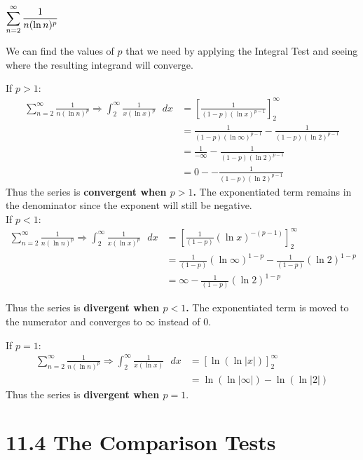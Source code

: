 \documentclass[12pt]{article}
\begin{document}
\begin{solution}
$\mathlarger{\sum_{n=2}^{\infty} \frac{1}{n(\ln n)^p}}$

We can find the values of $p$ that we need by applying the Integral Test and seeing where the resulting integrand will converge.


If $p > 1$:
\begin{align*}
\sum_{n=2}^{\infty} \frac{1}{n(\ln n)^p} \Rightarrow \int^{\infty}_2 \frac{1}{x(\ln x)^{p}} \text{ } dx & = \left[ \frac{1}{(1 - p)(\ln x)^{p -1}} \right]^{\infty}_2 \\
&= \frac{1}{(1 - p)(\ln \infty)^{p - 1}} - \frac{1}{(1 - p)(\ln 2)^{p - 1}} \\
&= \frac{1}{-\infty} - \frac{1}{(1 - p)(\ln 2)^{p - 1}} \\
&= 0 - - \frac{1}{(1 - p)(\ln 2)^{p - 1}} 
\end{align*} Thus the series is \textbf{convergent when $p > 1$.}  The exponentiated term remains in the denominator since the exponent will still be negative.  ~\\

If $p < 1$:
\begin{align*}
\sum_{n=2}^{\infty} \frac{1}{n(\ln n)^p} \Rightarrow \int^{\infty}_2 \frac{1}{x(\ln x)^{p}} \text{ } dx & = \left[ \frac{1}{(1 - p)}(\ln x)^{-(p - 1)} \right]^{\infty}_2 \\
&= \frac{1}{(1 - p)}(\ln \infty)^{1 - p} - \frac{1}{(1 - p)}(\ln 2)^{1 - p}  \\
&= \infty - \frac{1}{(1 - p)}(\ln 2)^{1 - p}
\end{align*} 

Thus the series is \textbf{divergent when $p < 1$.} The exponentiated term is moved to the numerator and converges to $\infty$ instead of $0$. 

If $p = 1$:
\begin{align*}
\sum_{n=2}^{\infty} \frac{1}{n(\ln n)^p} \Rightarrow \int^{\infty}_2 \frac{1}{x(\ln x)} \text{ } dx & = \left[ \ln(\ln|x|) \right]^{\infty}_2 \\
&= \ln(\ln|\infty|) - \ln(\ln|2|) 
\end{align*} 
Thus the series is \textbf{divergent when $p = 1$}.
\end{solution}


\pagebreak
\section*{11.4 The Comparison Tests}
\end{document}

